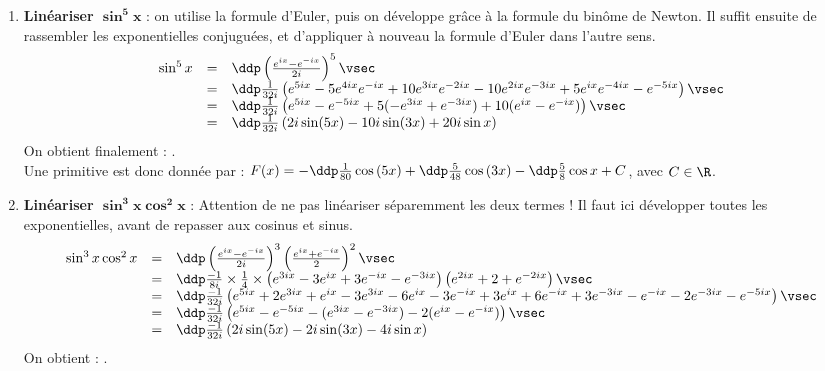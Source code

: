 \begin{correction}   \;
\begin{enumerate}
\item \textbf{Lin\'eariser $\mathbf{\sin^5{x}}$} : on utilise la formule d'Euler, puis on d\'eveloppe gr\^ace \`a la formule du bin\^ome de Newton. Il suffit ensuite de rassembler les exponentielles conjugu\'ees, et d'appliquer \`a nouveau la formule d'Euler dans l'autre sens.
$$\begin{array}{rcl}
\sin^5 x & = & \ddp \left( \frac{e^{ix} - e^{-i x}}{2i} \right)^5\vsec\\
& =& \ddp \frac{1}{32 i} \left( e^{5ix} - 5 e^{4ix}e^{-ix} + 10 e^{3ix} e^{-2ix} - 10 e^{2ix}e^{-3ix} + 5 e^{ix}e^{-4ix} - e^{-5ix}\right)\vsec\\
& =& \ddp \frac{1}{32 i} \left( e^{5ix} - e^{-5ix} + 5 (-e^{3ix} + e^{-3ix}) + 10 (e^{ix} - e^{-ix} ) \right)\vsec\\
& = & \ddp \frac{1}{32 i} \left( 2i \sin(5x) - 10i \sin(3x) + 20 i\sin x\right) 
\end{array}$$
On obtient finalement : .\\
Une primitive est donc donn\'ee par : $F(x) = -\ddp\frac{1}{80}\cos{(5x)}+\ddp\frac{5}{48}\cos{(3x)}-\ddp\frac{5}{8}\cos{x}+C$, avec $C \in \R$.
\item \textbf{Lin\'eariser $\mathbf{\sin^3{x}\cos^2{x}}$} : Attention de ne pas lin\'eariser s\'eparemment les deux termes ! Il faut ici d\'evelopper toutes les exponentielles, avant de repasser aux cosinus et sinus.
$$\begin{array}{rcl}
\sin^3{x}\cos^2{x} & = &\ddp \left( \frac{e^{ix}-e^{-ix}}{2i}\right)^3 \left( \frac{e^{ix}+e^{-ix}}{2}\right)^2\vsec\\
& = & \ddp \frac{-1}{8i} \times \frac{1}{4} \times \left(e^{3ix} - 3 e^{ix} + 3 e^{-ix} - e^{-3ix}\right) \left(e^{2ix} + 2 + e^{-2ix}\right)\vsec\\
& = & \ddp \frac{-1}{32i} \left(e^{5ix} + 2e^{3ix} + e^{ix} - 3e^{3ix} - 6 e^{ix} - 3 e^{-ix} + 3 e^{ix} + 6 e^{-ix} + 3 e^{-3ix} - e^{-ix} - 2 e^{-3ix} - e^{-5ix} \right)\vsec\\
& = & \ddp \frac{-1}{32i} \left(e^{5ix} - e^{-5ix} - (e^{3ix} - e^{-3ix}) - 2 (e^{ix} - e^{-ix})\right)\vsec\\
& = & \ddp \frac{-1}{32i} \left(2i \sin (5x) - 2i \sin(3x) - 4i \sin x\right)
\end{array}$$
On obtient : .\\

\end{enumerate}
\end{correction}
